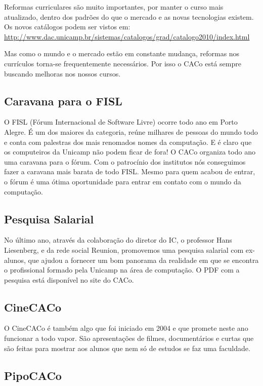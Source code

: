 Reformas curriculares são muito importantes, por manter o curso mais atualizado,
dentro dos padrões do que o mercado e as novas tecnologias existem. Os novos
catálogos podem ser vistos em:
\url{http://www.dac.unicamp.br/sistemas/catalogos/grad/catalogo2010/index.html}

Mas como o mundo e o mercado estão em constante mudança, reformas nos currículos
torna-se frequentemente necessários. Por isso o CACo está sempre buscando
melhoras nos nossos cursos.

\subsection{Caravana para o FISL}

O FISL (Fórum Internacional de Software Livre) ocorre todo ano em Porto Alegre.
É um dos maiores da categoria, reúne milhares de pessoas do mundo todo e conta
com palestras dos mais renomados nomes da computação. E é claro que os
computeiros da Unicamp não podem ficar de fora! O CACo organiza todo ano uma
caravana para o fórum. Com o patrocínio dos institutos nós conseguimos fazer
a caravana mais barata de todo FISL. Mesmo para quem acabou de entrar, o fórum
é uma ótima oportunidade para entrar em contato com o mundo da computação.

\subsection{Pesquisa Salarial}

No último ano, através da colaboração do diretor do IC, o professor Hans
Liesenberg, e da rede social Reunion, promovemos uma pesquisa salarial com
ex-alunos, que ajudou a fornecer um bom panorama da realidade em que se encontra
o profissional formado pela Unicamp na área de computação. O PDF com a pesquisa
está disponível no site do CACo.

\subsection{CineCACo}

O CineCACo é também algo que foi iniciado em 2004 e que promete neste ano
funcionar a todo vapor. São apresentações de filmes, documentários e curtas que
são feitas para mostrar aos alunos que nem só de estudos se faz uma faculdade.

\subsection{PipoCACo}

